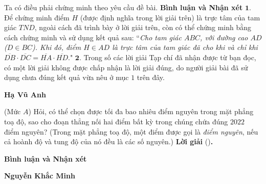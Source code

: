 \begin{multicols}{2}
	\vskip 0.05cm
	Ta có điều phải chứng minh theo yêu cầu đề bài.
	\vskip 0.05cm
	\textbf{\color{thachthuctoanhoc}Bình luận và Nhận xét}
	\vskip 0.05cm
	$\pmb{1.}$ Để chứng minh điểm $H$ (được định nghĩa trong lời giải trên) là trực tâm của tam giác $TND$, ngoài cách đã trình bày ở lời giải trên, còn có thể chứng minh bằng cách chứng minh và sử dụng kết quả sau:
	\vskip 0.05cm
	``\textit{Cho tam giác $ABC$, với đường cao $AD$ ($D \in BC$). Khi đó, điểm $H \in AD$ là trực tâm của tam giác đã cho khi và chỉ khi  $\overline {DB}  \cdot \overline {DC}  = \overline {HA}  \cdot \overline {HD} .$}"
	\vskip 0.05cm
	$\pmb{2.}$ Trong số các lời giải Tạp chí đã nhận được từ bạn đọc, có một lời giải không được chấp nhận là lời giải đúng, do người giải bài đã sử dụng chưa đúng kết quả vừa nêu ở mục $1$ trên đây.
	\begin{flushright}
		\textbf{\color{thachthuctoanhoc}Hạ Vũ Anh}
	\end{flushright}
	{\color{thachthuctoanhoc}{\usefont{T5}{qag}{b}{n} P670.}}
	(Mức $A$) Hỏi, có thể chọn được tối đa bao nhiêu điểm nguyên trong mặt phẳng toạ độ, sao cho đoạn thẳng nối hai điểm bất kỳ trong chúng chứa đúng $2022$ điểm nguyên?
	\vskip 0.05cm
	(Trong mặt phẳng toạ độ, một điểm được gọi là {\it điểm nguyên}, nếu cả hoành độ và tung độ của nó đều là các số nguyên.)
	\vskip 0.05cm
	\textbf{\color{thachthuctoanhoc}Lời giải} ()\textbf{\color{thachthuctoanhoc}.}
	
	\textbf{\color{thachthuctoanhoc}Bình luận và Nhận xét}
	
	\begin{flushright}
		\textbf{\color{thachthuctoanhoc}Nguyễn Khắc Minh}
	\end{flushright}
\end{multicols}
